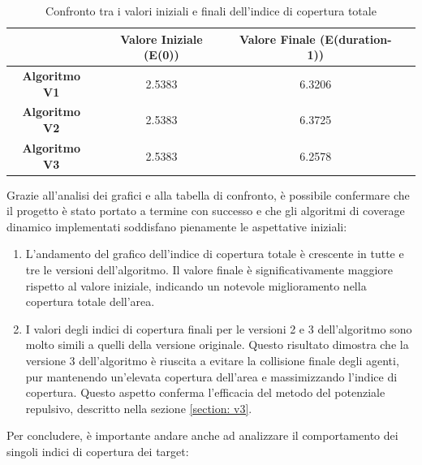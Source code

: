 \documentclass[twoside]{article}
\begin{document}
\begin{table}[H]
\centering
\begin{tabular}{cccc}
\toprule
 & \textbf{Valore Iniziale (E(0))} & \textbf{Valore Finale (E(duration-1))}\\ \midrule
\textbf{Algoritmo V1} & 2.5383 & 6.3206\\
\textbf{Algoritmo V2} & 2.5383 & 6.3725\\
\textbf{Algoritmo V3} & 2.5383 & 6.2578\\ \bottomrule
\end{tabular}
\caption{Confronto tra i valori iniziali e finali dell'indice di copertura totale}
\label{tab:confronto_indici}
\end{table}

Grazie all'analisi dei grafici e alla tabella di confronto, è possibile confermare che il progetto è stato portato a termine con successo e che gli algoritmi di coverage dinamico implementati soddisfano pienamente le aspettative iniziali:

\begin{enumerate}
    \item L'andamento del grafico dell'indice di copertura totale è crescente in tutte e tre le versioni dell'algoritmo. Il valore finale è significativamente maggiore rispetto al valore iniziale, indicando un notevole miglioramento nella copertura totale dell'area.
    
    \item I valori degli indici di copertura finali per le versioni 2 e 3 dell'algoritmo sono molto simili a quelli della versione originale. Questo risultato dimostra che la versione 3 dell'algoritmo è riuscita a evitare la collisione finale degli agenti, pur mantenendo un'elevata copertura dell'area e massimizzando l'indice di copertura. Questo aspetto conferma l'efficacia del metodo del potenziale repulsivo, descritto nella sezione \ref{section: v3}.
\end{enumerate}

\newpage

Per concludere, è importante andare anche ad analizzare il comportamento dei singoli indici di copertura dei target:
\end{document}
